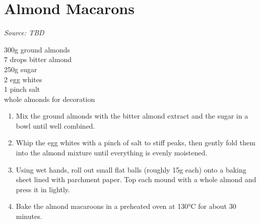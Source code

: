 \documentclass{report}
\begin{document}
\section{Almond Macarons}
\textit{Source: TBD}\\
\begin{minipage}[t]{0.21\textwidth} \vspace{0pt}
300g ground almonds\\
7 drops bitter almond\\
250g sugar\\
2 egg whites\\
1 pinch salt\\
whole almonds for decoration
\end{minipage}
\hfill
\begin{minipage}[t]{0.78\textwidth} \vspace{0pt}
	\begin{enumerate}
		\item Mix the ground almonds with the bitter almond extract and the sugar in a bowl until well combined.
		\item Whip the egg whites with a pinch of salt to stiff peaks, then gently fold them into the almond mixture until everything is evenly moistened.
		\item Using wet hands, roll out small flat balls (roughly 15g each) onto a baking sheet lined with parchment paper. Top each mound with a whole almond and press it in lightly.
		\item Bake the almond macaroons in a preheated oven at 130°C for about 30 minutes.
	\end{enumerate}	
\end{minipage}
\end{document}
